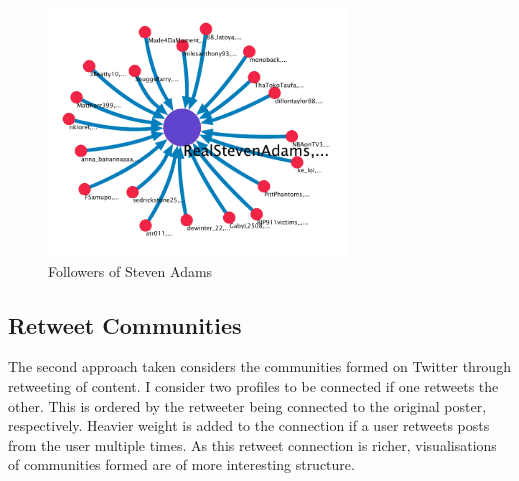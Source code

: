 \begin{figure}[h!]
\begin{center}
\centering
\includegraphics[width=300px]{Images/steven_adams_followers.pdf}
\caption{Followers of Steven Adams}
\label{fig:stevenadamsfollowers}
\end{center}
\end{figure}


\subsection{Retweet Communities}

The second approach taken considers the communities formed on Twitter through retweeting of content. I consider two profiles to be connected if one retweets the other. This is ordered by the retweeter being connected to the original poster, respectively. Heavier weight is added to the connection if a user retweets posts from the user multiple times. As this retweet connection is richer, visualisations of communities formed are of more interesting structure. 

